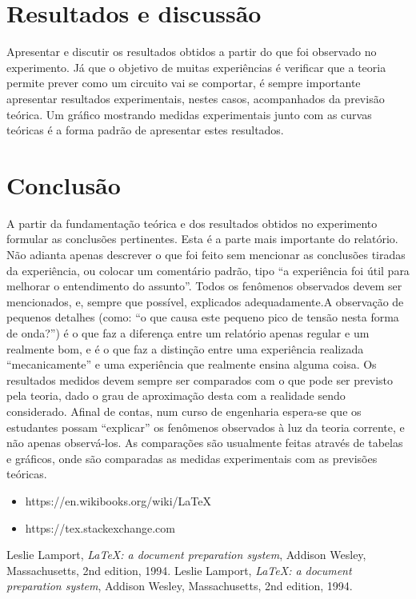 \documentclass[10pt,conference]{IEEEtran}                      %
\begin{document}
\section{Resultados e discussão}
Apresentar e discutir os resultados obtidos a partir do que foi observado no experimento. Já que o objetivo de muitas experiências é verificar que a teoria permite prever como um circuito vai se comportar, é sempre importante apresentar resultados experimentais, nestes casos, acompanhados da previsão teórica. Um gráfico mostrando medidas experimentais junto com as curvas teóricas é a forma padrão de apresentar estes resultados.~\cite{lamport94}
\section{Conclusão}
A partir da fundamentação teórica e dos resultados obtidos no experimento formular as conclusões pertinentes. Esta é a parte mais importante do relatório. Não adianta apenas descrever o que foi feito sem mencionar as conclusões tiradas da experiência, ou colocar um comentário padrão, tipo “a experiência foi útil para melhorar o entendimento do assunto”. Todos os fenômenos observados devem ser mencionados, e, sempre que possível, explicados adequadamente.A observação de pequenos detalhes (como: “o que causa este pequeno pico de tensão nesta forma de onda?”) é o que faz a diferença entre um relatório apenas regular e um realmente bom, e é o que faz a distinção entre uma experiência realizada “mecanicamente” e uma experiência que realmente ensina alguma coisa. Os resultados medidos devem sempre ser comparados com o que pode ser previsto pela teoria, dado o grau de aproximação desta com a realidade sendo considerado. Afinal de contas, num curso de engenharia espera-se que os estudantes possam “explicar” os fenômenos observados à luz da teoria corrente, e não apenas observá-los. As comparações são usualmente feitas através de tabelas e gráficos, onde são comparadas as medidas experimentais com as previsões teóricas.
\begin{itemize}
	\item https://en.wikibooks.org/wiki/LaTeX
	\item https://tex.stackexchange.com
\end{itemize}
\begin{thebibliography}{9}
	Leslie Lamport,
	\emph{\LaTeX: a document preparation system},
	Addison Wesley, Massachusetts,
	2nd edition,
	1994.
	Leslie Lamport,
	\emph{\LaTeX: a document preparation system},
	Addison Wesley, Massachusetts,
	2nd edition,
	1994.
\end{thebibliography}
\end{document}
